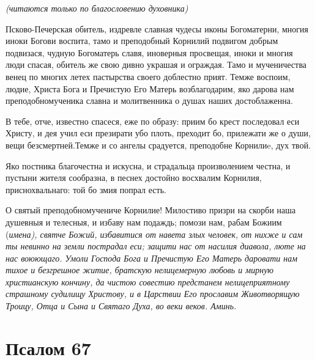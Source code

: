 \itshape (читаются только по благословению духовника)\normalfont{}




Псково-Печерская обитель, издревле славная чудесы иконы Богоматерни, многия иноки Богови воспита, тамо и преподобный Корнилий подвигом добрым подвизася, чудную Богоматерь славя, иноверныя просвещая, иноки и многия люди спасая, обитель же свою дивно украшая и ограждая. Тамо и мученичества венец по многих летех пастырства своего доблестно прият. Темже воспоим, людие, Христа Бога и Пречистую Его Матерь возблагодарим, яко дарова нам преподобномученика славна и молитвенника о душах наших достоблаженна.




В тебе, отче, известно спасеся, еже по образу: приим бо крест последовал еси Христу, и дея учил еси презирати убо плоть, преходит бо, прилежати же о души, вещи безсмертней.Темже и со ангелы срадуется, преподобне Корнилиe, дух твой.




Яко постника благочестна и искусна, и страдальца произволением честна, и пустыни жителя сообразна, в песнех достойно восхвалим Корнилия, приснохвальнаго: той бо змия попрал есть.




О святый преподобномучениче Корнилие!  Милостиво призри на скорби наша душевныя и телесныя, и избаву нам подаждь; помози нам, рабам Божиим (\itshape имена\normalfont{}), святче Божий, избавитися от навета злых человек, от нихже и сам ты невинно на земли пострадал еси; защити нас от насилия диавола, люте на нас воюющаго. Умоли Господа Бога и Пречистую Его Матерь даровати нам тихое и безгрешное житие, братскую нелицемерную любовь и мирную христианскую кончину, да чистою совестию предстанем нелицеприятному страшному судилищу Христову, и в Царствии Его прославим Животворящую Троицу, Отца и Сына и Святаго Духа, во веки веков. Аминь.


\section{Псалом 67}
 


